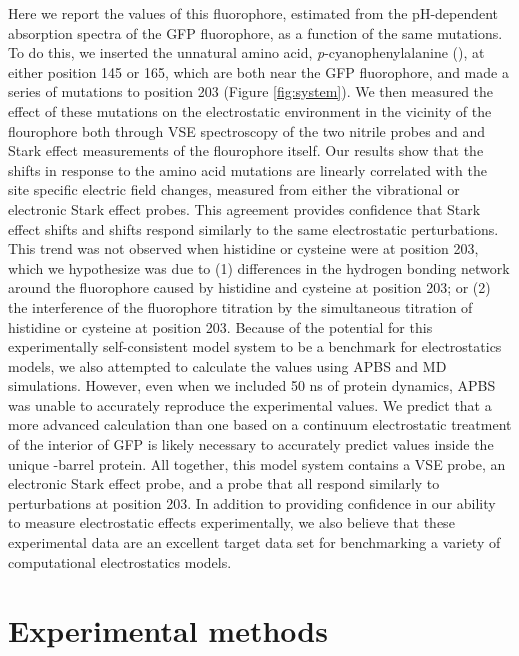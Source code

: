 Here we report the \pKa{} values of this fluorophore, estimated from the pH-dependent absorption spectra of the GFP fluorophore, as a function of the same mutations. 
To do this, we inserted the unnatural amino acid, \emph{p}-cyanophenylalanine (\pCNF{}), at either position 145 or 165, which are both near the GFP fluorophore, and made a series of mutations to position 203 (Figure \ref{fig:system}). 
We then measured the effect of these mutations on the electrostatic environment in the vicinity of the flourophore both through VSE spectroscopy of the two nitrile probes and \pKa{} and Stark effect measurements of the flourophore itself. 
Our results show that the \pKa{} shifts in response to the amino acid mutations are linearly correlated with the site specific electric field changes, measured from either the vibrational or electronic Stark effect probes. 
This agreement provides confidence that Stark effect shifts and \pKa{} shifts respond similarly to the same electrostatic perturbations. 
This trend was not observed when histidine or cysteine were at position 203, which we hypothesize was due to (1) differences in the hydrogen bonding network around the fluorophore caused by histidine and cysteine at position 203; or (2) the interference of the fluorophore titration by the simultaneous titration of histidine or cysteine at position 203. 
Because of the potential for this experimentally self-consistent model system to be a benchmark for electrostatics models, we also attempted to calculate the \pKa{} values using APBS and MD simulations.
However, even when we included 50 \si{\ns} of protein dynamics, APBS was unable to accurately reproduce the experimental \pKa{} values. 
We predict that a more advanced calculation than one based on a continuum electrostatic treatment of the interior of GFP is likely necessary to accurately predict \pKa{} values inside the unique \textbeta{}-barrel protein. 
All together, this model system contains a VSE probe, an electronic Stark effect probe, and a \pKa{} probe that all respond similarly to perturbations at position 203. 
In addition to providing confidence in our ability to measure electrostatic effects experimentally, we also believe that these experimental data are an excellent target data set for benchmarking a variety of computational electrostatics models.

\section{Experimental methods} \label{pKa-methods}

